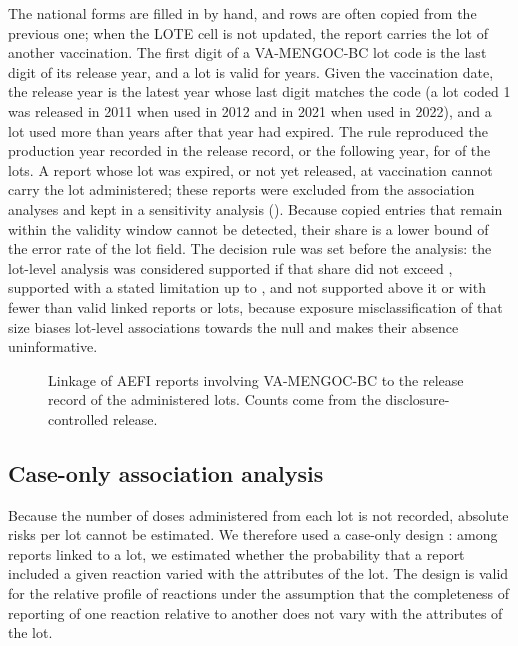 \documentclass[11pt]{article}
\begin{document}
The national forms are filled in by hand, and rows are often copied from the previous one; when the
LOTE cell is not updated, the report carries the lot of another vaccination. The first digit of a
VA-MENGOC-BC lot code is the last digit of its release year, and a lot is valid for
\PTShelfLife{} years. Given the vaccination date, the release year is the latest year whose last
digit matches the code (a lot coded 1 was released in 2011 when used in 2012 and in 2021 when used in
2022), and a lot used more than \PTShelfLife{} years after that year had expired. The rule reproduced
the production year recorded in the release record, or the following year, for \PTCodeRuleAgreement{}
of the lots. A report whose lot was expired, or not yet released, at vaccination cannot carry the lot
administered; these reports were excluded from the association analyses and kept in a sensitivity
analysis (). Because copied entries that remain within the validity window cannot
be detected, their share is a lower bound of the error rate of the lot field. The decision rule
was set before the analysis: the lot-level analysis was considered supported if that share did not
exceed \PTFeasCautionPct, supported with a stated limitation up to \PTFeasMaxPct, and not supported
above it or with fewer than \PTFeasMinReports{} valid linked reports or \PTFeasMinLots{} lots, because
exposure misclassification of that size biases lot-level associations towards the null and makes
their absence uninformative.

\begin{figure}[tbp]
\centering
\LinkageFlow
\caption{Linkage of AEFI reports involving VA-MENGOC-BC to the release record of the administered
lots. Counts come from the disclosure-controlled release.}
\label{fig:flow}
\end{figure}

\subsection{Case-only association analysis}\label{sec:m-assoc}
Because the number of doses administered from each lot is not recorded, absolute risks per lot
cannot be estimated. We therefore used a case-only design \cite{Piegorsch1994}: among reports
linked to a lot, we estimated whether the probability that a report included a given reaction
varied with the attributes of the lot. The design is valid for the relative profile of reactions
under the assumption that the completeness of reporting of one reaction relative to another does
not vary with the attributes of the lot.
\end{document}
